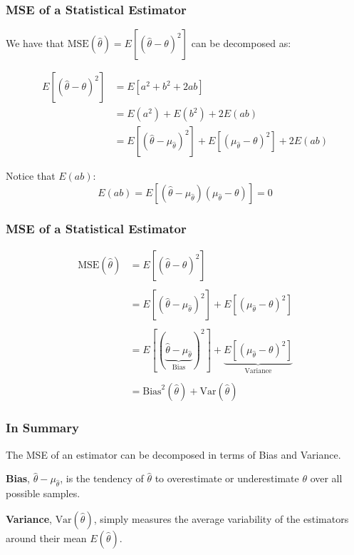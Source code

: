 \documentclass[12pt]{beamer}\usepackage[]{graphicx}\usepackage[]{color}
\begin{document}
\begin{frame}
\frametitle{MSE of a Statistical Estimator}

We have that $\text{MSE}(\hat{\theta}) = E[(\hat{\theta} - \theta)^2]$ can be decomposed as:

\begin{align*}
E \left [ (\hat{\theta} - \theta)^2 \right ] &= E[a^2 + b^2 + 2ab] \\
&= E(a^2) + E(b^2) + 2E(ab) \\
&= E [ (\hat{\theta} - \mu_{\hat{\theta}})^2 ] +
E [ (\mu_{\hat{\theta}} - \theta)^2 ] + 2E(ab)
\end{align*}

Notice that $E(ab)$:
$$
E(ab) = E[ (\hat{\theta} - \mu_{\hat{\theta}}) (\mu_{\hat{\theta}} - \theta) ] = 0
$$

\end{frame}


\begin{frame}
\frametitle{MSE of a Statistical Estimator}

\begin{align*}
\text{MSE}(\hat{\theta}) &= E \left [ (\hat{\theta} - \theta)^2 \right ] \\
& \\
&= E [ (\hat{\theta} - \mu_{\hat{\theta}})^2 ] +
E [ (\mu_{\hat{\theta}} - \theta)^2 ] \\
& \\
&= E [(\underbrace{\hat{\theta} - \mu_{\hat{\theta}}}_{\text{Bias}})^2] + 
\underbrace{E [ (\mu_{\hat{\theta}} - \theta)^2 ]}_{\text{Variance}} \\
& \\
&= \text{Bias}^{2} (\hat{\theta}) + \text{Var}(\hat{\theta})
\end{align*}

\end{frame}


\begin{frame}
\frametitle{In Summary}

The MSE of an estimator can be decomposed in terms of Bias and Variance.

\bigskip
\textbf{Bias}, $\hat{\theta} - \mu_{\hat{\theta}}$, is the tendency of $\hat{\theta}$ 
to overestimate or underestimate $\theta$ over all possible samples.

\bigskip
\textbf{Variance}, $\text{Var}(\hat{\theta})$, simply measures the average 
variability of the estimators around their mean $E(\hat{\theta})$.

\end{frame}
\end{document}
